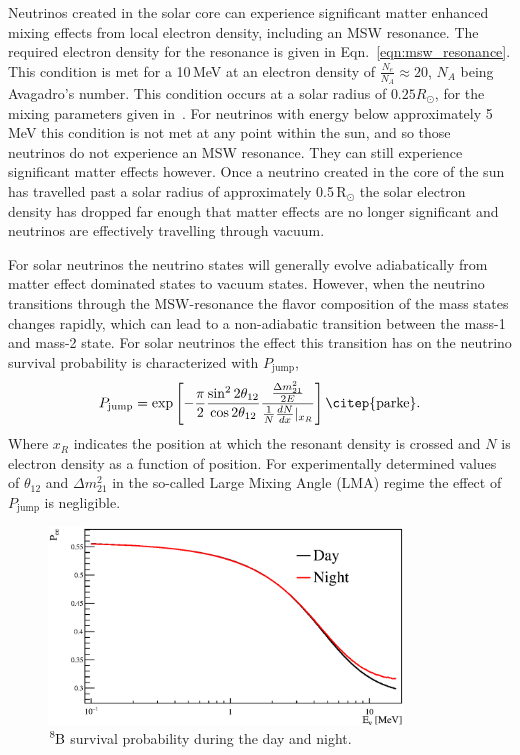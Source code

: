 Neutrinos created in the solar core can experience significant matter enhanced
mixing effects from local electron density, including an MSW resonance.
The required electron density for the resonance is given in Eqn.~\ref{eqn:msw_resonance}.
This condition is met for a 10\,MeV at an electron density
of $\frac{N_{e}}{N_{A}} \approx 20$, $N_{A}$ being Avagadro's number.
This condition occurs at a solar radius of $0.25R_{\odot}$, 
for the mixing parameters given in~\citep{pdg_globalfit}.
For neutrinos with energy below approximately 5\,MeV this condition is not met
at any point within the sun, and so those neutrinos do not experience an MSW
resonance. They can still experience significant matter effects however.
Once a neutrino created in the core of the sun has travelled past a solar radius of
approximately 0.5\,$\text{R}_{\odot}$ %
the solar electron density has dropped far enough that matter effects are no longer significant
and neutrinos are effectively travelling through vacuum.%

For solar neutrinos the neutrino states will generally evolve adiabatically from
matter effect dominated states to vacuum states.
However, when the neutrino transitions through the MSW-resonance
the flavor composition of the mass states changes rapidly,
which can lead to a non-adiabatic transition
between the mass-1 and mass-2 state.
For solar neutrinos the effect this transition has on the
neutrino survival probability is characterized with $P_{\mathrm{jump}}$,
\begin{equation}
    P_{\mathrm{jump}} = \mathrm{exp}\left[-\dfrac{\pi}{2} \dfrac{\sin^{2}2\theta_{12}}{\cos2\theta_{12}}
               \dfrac{\frac{\Delta m^{2}_{21}}{2E}}{\frac{1}{N} \frac{dN}{dx}|_{x_{R}}}   \right]
\text{\citep{parke}.}
\end{equation}
Where $x_{R}$ indicates the position at which the resonant density is crossed
and $N$ is electron density as a function of position.
For experimentally determined values of $\theta_{12}$ and $\Delta m^{2}_{21}$ in the so-called
Large Mixing Angle (LMA) regime the effect of $P_{\mathrm{jump}}$ is negligible.

\begin{figure}[htbp]
\centering
\includegraphics[width=0.84\textwidth]{day_night_example}
    \caption[Day and Night Survival Probability]{$\ce{^{8}B}$ survival
    probability during the day and night.}
\label{fig:day_night_example}
\end{figure}

